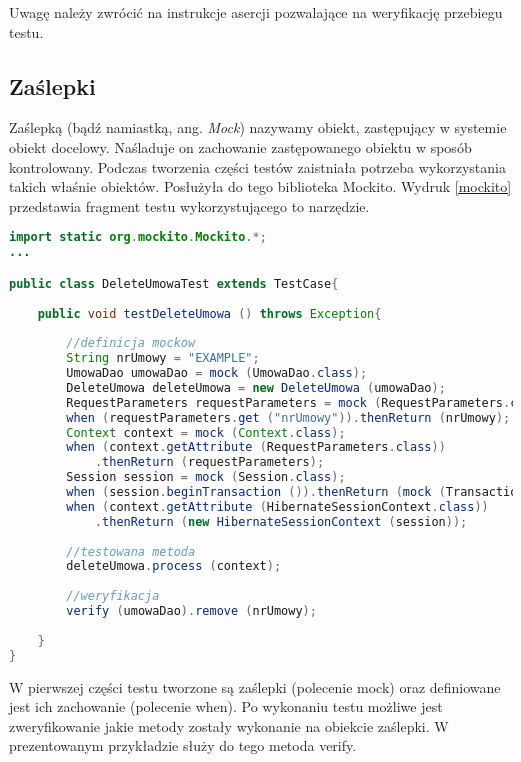 Uwagę należy zwrócić na instrukcje asercji pozwalające na weryfikację przebiegu testu.

\subsection[Zaślepki][Zaślepki]{Zaślepki}
Zaślepką (bądź namiastką, ang. \textit{Mock}) nazywamy obiekt, zastępujący w systemie obiekt docelowy. Naśladuje on zachowanie zastępowanego obiektu w sposób kontrolowany. Podczas tworzenia części testów zaistniała potrzeba wykorzystania takich właśnie obiektów. Posłużyła do tego biblioteka Mockito. Wydruk \ref{mockito} przedstawia fragment testu wykorzystującego to narzędzie.

\begin{lstlisting}[language=Java,style=outcode,showstringspaces=false,caption=Test z użyciem zaślepek,label={mockito}]
import static org.mockito.Mockito.*;
...

public class DeleteUmowaTest extends TestCase{
	
	public void testDeleteUmowa () throws Exception{
		
		//definicja mockow
		String nrUmowy = "EXAMPLE";
		UmowaDao umowaDao = mock (UmowaDao.class);
		DeleteUmowa deleteUmowa = new DeleteUmowa (umowaDao);
		RequestParameters requestParameters = mock (RequestParameters.class);
		when (requestParameters.get ("nrUmowy")).thenReturn (nrUmowy);
		Context context = mock (Context.class);
		when (context.getAttribute (RequestParameters.class))
			.thenReturn (requestParameters);
		Session session = mock (Session.class);
		when (session.beginTransaction ()).thenReturn (mock (Transaction.class));
		when (context.getAttribute (HibernateSessionContext.class))
			.thenReturn (new HibernateSessionContext (session));
		
		//testowana metoda
		deleteUmowa.process (context);
		
		//weryfikacja
		verify (umowaDao).remove (nrUmowy);
		
	}
}
\end{lstlisting}

W pierwszej części testu tworzone są zaślepki (polecenie mock) oraz definiowane jest ich zachowanie (polecenie when). Po wykonaniu testu możliwe jest zweryfikowanie jakie metody zostały wykonanie na obiekcie zaślepki. W prezentowanym przykładzie służy do tego metoda verify.

